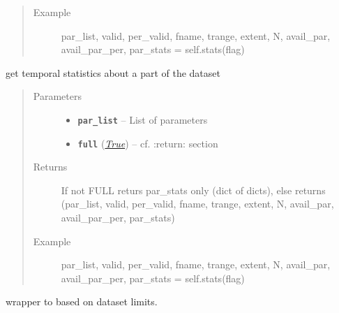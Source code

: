 \documentclass[letterpaper,10pt,english]{sphinxmanual}
\begin{document}
\begin{fulllineitems}
\begin{fulllineitems}
\begin{quote}
\begin{description}
\item[{Example}] \leavevmode
par\_list, valid, per\_valid, fname, trange, extent, N, avail\_par, avail\_par\_per, par\_stats = self.stats(flag)

\end{description}\end{quote}

\end{fulllineitems}


\begin{fulllineitems}
\label{altimetry.data:altimetry.data.hydro_data.get_timestats}
get temporal statistics about a part of the dataset
\begin{quote}\begin{description}
\item[{Parameters}] \leavevmode\begin{itemize}
\item {} 
\textbf{\texttt{par\_list}} -- List of parameters

\item {} 
\textbf{\texttt{full}} (\href{http://docs.python.org/library/constants.html\#True}{\emph{True}}) -- cf. :return: section

\end{itemize}

\item[{Returns}] \leavevmode
If not FULL returs par\_stats only (dict of dicts), else returns (par\_list, valid, per\_valid, fname, trange, extent, N, avail\_par, avail\_par\_per, par\_stats)

\item[{Example}] \leavevmode
par\_list, valid, per\_valid, fname, trange, extent, N, avail\_par, avail\_par\_per, par\_stats = self.stats(flag)

\end{description}\end{quote}

\end{fulllineitems}


\begin{fulllineitems}
\label{altimetry.data:altimetry.data.hydro_data.in_limits}
wrapper to  based on dataset limits.


\end{fulllineitems}
\end{fulllineitems}
\end{document}
